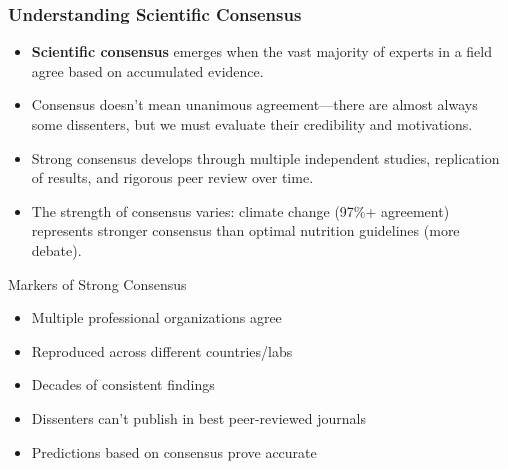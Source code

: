\documentclass{beamer}
\begin{document}
	\begin{frame}
		\frametitle{Understanding Scientific Consensus}
		\begin{itemize}
			\item \textbf{Scientific consensus} emerges when the vast majority of experts in a field agree based on accumulated evidence.
			\item Consensus doesn't mean unanimous agreement—there are almost always some dissenters, but we must evaluate their credibility and motivations.
			\item Strong consensus develops through multiple independent studies, replication of results, and rigorous peer review over time.
			\item The strength of consensus varies: climate change (97\%+ agreement) represents stronger consensus than optimal nutrition guidelines (more debate).
		\end{itemize}
		
		\begin{block}{Markers of Strong Consensus}
			\scriptsize
			\begin{itemize}
				\item Multiple professional organizations agree
				\item Reproduced across different countries/labs
				\item Decades of consistent findings
				\item Dissenters can't publish in best peer-reviewed journals
				\item Predictions based on consensus prove accurate
			\end{itemize}
		\end{block}
	\end{frame}
	
\end{document}
